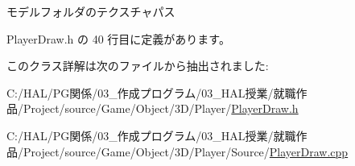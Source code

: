 モデルフォルダのテクスチャパス 



 Player\+Draw.\+h の 40 行目に定義があります。



このクラス詳解は次のファイルから抽出されました\+:\begin{DoxyCompactItemize}
\item 
C\+:/\+H\+A\+L/\+P\+G関係/03\+\_\+作成プログラム/03\+\_\+\+H\+A\+L授業/就職作品/\+Project/source/\+Game/\+Object/3\+D/\+Player/\mbox{\hyperlink{_player_draw_8h}{Player\+Draw.\+h}}\item 
C\+:/\+H\+A\+L/\+P\+G関係/03\+\_\+作成プログラム/03\+\_\+\+H\+A\+L授業/就職作品/\+Project/source/\+Game/\+Object/3\+D/\+Player/\+Source/\mbox{\hyperlink{_player_draw_8cpp}{Player\+Draw.\+cpp}}\end{DoxyCompactItemize}

